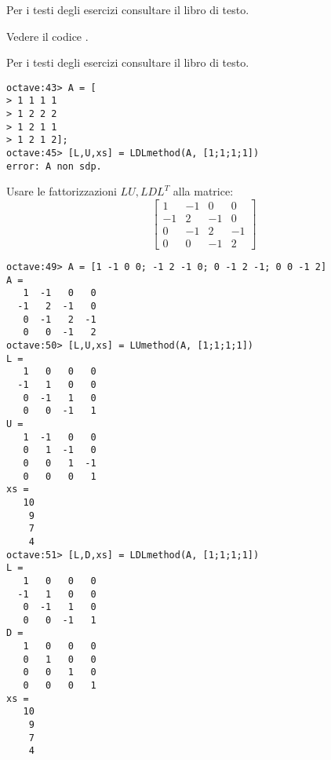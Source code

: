 \begin{exercise}[3.16, 3.17]
Per i testi degli esercizi consultare il libro di testo.
\end{exercise}
Vedere il codice .

\begin{exercise}[3.18]
Per i testi degli esercizi consultare il libro di testo.
\end{exercise}
\begin{lstlisting}
octave:43> A = [
> 1 1 1 1
> 1 2 2 2
> 1 2 1 1
> 1 2 1 2];
octave:45> [L,U,xs] = LDLmethod(A, [1;1;1;1])
error: A non sdp.
\end{lstlisting}

\begin{exercise}
Usare le fattorizzazioni $LU, LDL^{T}$ alla matrice:
\begin{displaymath}
\begin{bmatrix}
1 & -1 & 0 & 0 \\
-1 & 2 & -1 & 0 \\
0 & -1 & 2 & -1 \\
0 & 0 & -1 & 2
\end{bmatrix}
\end{displaymath}
\end{exercise}

\begin{lstlisting}
octave:49> A = [1 -1 0 0; -1 2 -1 0; 0 -1 2 -1; 0 0 -1 2]
A =
   1  -1   0   0
  -1   2  -1   0
   0  -1   2  -1
   0   0  -1   2
octave:50> [L,U,xs] = LUmethod(A, [1;1;1;1])
L =
   1   0   0   0
  -1   1   0   0
   0  -1   1   0
   0   0  -1   1
U =
   1  -1   0   0
   0   1  -1   0
   0   0   1  -1
   0   0   0   1
xs =
   10
    9
    7
    4
octave:51> [L,D,xs] = LDLmethod(A, [1;1;1;1])
L =
   1   0   0   0
  -1   1   0   0
   0  -1   1   0
   0   0  -1   1
D =
   1   0   0   0
   0   1   0   0
   0   0   1   0
   0   0   0   1
xs =
   10
    9
    7
    4
\end{lstlisting}

